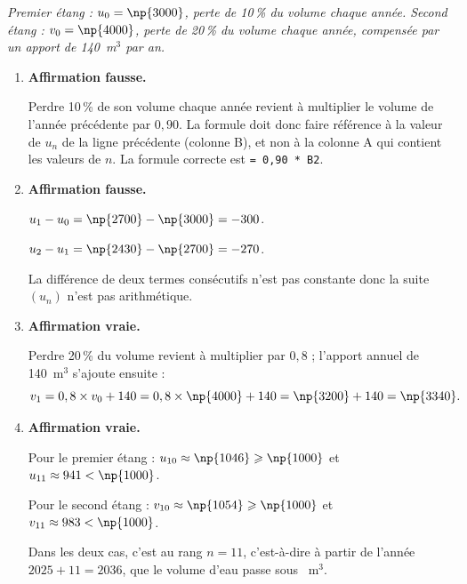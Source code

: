 \emph{Premier étang : $u_0 = \np{3000}$, perte de 10\,\% du volume chaque année. Second étang :
$v_0 = \np{4000}$, perte de 20\,\% du volume chaque année, compensée par un apport
de 140~m$^3$ par an.}

\begin{enumerate}
	\item \textbf{Affirmation fausse.}

	Perdre 10\,\% de son volume chaque année revient à multiplier le volume de l'année
	précédente par $0,90$. La formule doit donc faire référence à la valeur de $u_n$ de la
	ligne précédente (colonne B), et non à la colonne A qui contient
	les valeurs de $n$. La formule correcte est \texttt{= 0,90 * B2}.

	\item \textbf{Affirmation fausse.}

	 $u_1 - u_0 = \np{2700} - \np{3000} = -300$.

	 $u_2 - u_1 = \np{2430} - \np{2700} =  -270$.

La différence de deux termes consécutifs n'est pas constante donc la suite $(u_n)$ n'est pas arithmétique.

	\item \textbf{Affirmation vraie.}

	Perdre 20\,\% du volume revient à multiplier par $0,8$ ; l'apport annuel de 140~m$^3$
	s'ajoute ensuite :
	\[v_1 = 0,8 \times v_0 + 140 = 0,8 \times \np{4000} + 140 = \np{3200} + 140 = \np{3340}.\]

	\item \textbf{Affirmation vraie.}

	Pour le premier étang : $u_{10} \approx \np{1046} \geqslant \np{1000}$ et
	$u_{11} \approx 941 < \np{1000}$.

	Pour le second étang : $v_{10} \approx \np{1054} \geqslant \np{1000}$
	et $v_{11} \approx 983 < \np{1000}$.

	Dans les deux cas, c'est au rang $n = 11$, c'est-à-dire à partir
	de l'année $2025 + 11 = 2036$, que le volume d'eau passe sous
	~m$^3$.
\end{enumerate}
